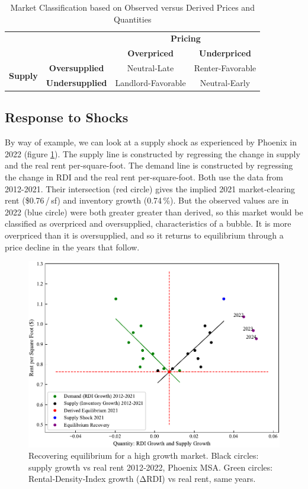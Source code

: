 \documentclass[APA,Times1COL]{WileyNJDv5} %
\begin{document}
\begin{table}[h!]
	\centering
	\caption{Market Classification based on Observed versus Derived Prices and Quantities}
	\begin{tabular}{cc|c|c|}
		\multicolumn{2}{c}{} & \multicolumn{2}{c}{\textbf{Pricing}} \\
		\multicolumn{2}{c}{} & \textbf{Overpriced} & \textbf{Underpriced} \\
		\cmidrule{3-4}
		\multirow{2}{*}{\textbf{Supply}} & \textbf{Oversupplied} & Neutral-Late  & Renter-Favorable \\
		\cmidrule{2-4}
		& \textbf{Undersupplied} & Landlord-Favorable & Neutral-Early \\
		\bottomrule
	\end{tabular}
\end{table}


\subsection{Response to Shocks}
By way of example, we can look at a supply shock as experienced by Phoenix in 2022 (figure \ref{fig:phoenix_mechanism}). The supply line is constructed by regressing the change in supply and the real rent per-square-foot. The demand line is constructed by regressing the change in RDI and the real rent per-square-foot. Both use the data from 2012-2021. Their intersection (red circle) gives the implied 2021 market‑clearing rent (\$0.76 / sf) and inventory growth (0.74 \%). But the observed values are in 2022 (blue circle) were both greater greater than derived, so this market would be classified as overpriced and oversupplied, characteristics of a bubble. It is more overpriced than it is oversupplied, and so it returns to equilibrium through a price decline in the years that follow. 

\begin{figure}[htb!]
	\centering
	\includegraphics[width=0.95\linewidth]{phoenix_example.pdf}
	\caption{Recovering equilibrium for a high growth market.  
		Black circles: supply growth vs real rent 2012‑2022, Phoenix MSA.  
		Green circles: Rental‑Density‑Index growth (ΔRDI) vs real rent, same years.  
}
	\label{fig:phoenix_mechanism}
\end{figure}
\end{document}
